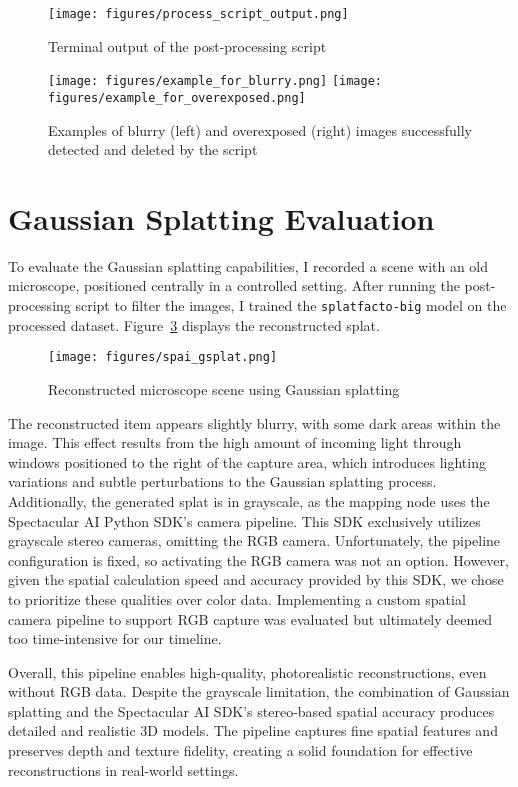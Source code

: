 \begin{figure}[htbp]
	\centering
	\texttt{[image: figures/process\_script\_output.png]}
	\caption{Terminal output of the post-processing script}
	\label{fig:image_process_script_output}
\end{figure}


\begin{figure}[htbp]
	\centering
	\texttt{[image: figures/example\_for\_blurry.png]}\hspace{1cm}
	\texttt{[image: figures/example\_for\_overexposed.png]}\\\vspace{5mm}
	\caption{Examples of blurry (left) and overexposed (right) images successfully detected and deleted by the script}
	\label{fig:blurry_overexposed_example}
\end{figure}
\FloatBarrier

\section{Gaussian Splatting Evaluation}
To evaluate the Gaussian splatting capabilities, I recorded a scene with an old microscope, positioned centrally in a controlled setting. After running the post-processing script to filter the images, I trained the \verb|splatfacto-big| model on the processed dataset. Figure~\ref{fig:spai_gsplat} displays the reconstructed splat.

\begin{figure}[htbp]
	\centering
	\texttt{[image: figures/spai\_gsplat.png]}
	\caption{Reconstructed microscope scene using Gaussian splatting}
	\label{fig:spai_gsplat}
\end{figure}

The reconstructed item appears slightly blurry, with some dark areas within the image. This effect results from the high amount of incoming light through windows positioned to the right of the capture area, which introduces lighting variations and subtle perturbations to the Gaussian splatting process. Additionally, the generated splat is in grayscale, as the mapping node uses the Spectacular AI Python SDK's camera pipeline. This SDK exclusively utilizes grayscale stereo cameras, omitting the RGB camera. Unfortunately, the pipeline configuration is fixed, so activating the RGB camera was not an option. However, given the spatial calculation speed and accuracy provided by this SDK, we chose to prioritize these qualities over color data. Implementing a custom spatial camera pipeline to support RGB capture was evaluated but ultimately deemed too time-intensive for our timeline.

Overall, this pipeline enables high-quality, photorealistic reconstructions, even without RGB data. Despite the grayscale limitation, the combination of Gaussian splatting and the Spectacular AI SDK’s stereo-based spatial accuracy produces detailed and realistic 3D models. The pipeline captures fine spatial features and preserves depth and texture fidelity, creating a solid foundation for effective reconstructions in real-world settings.
